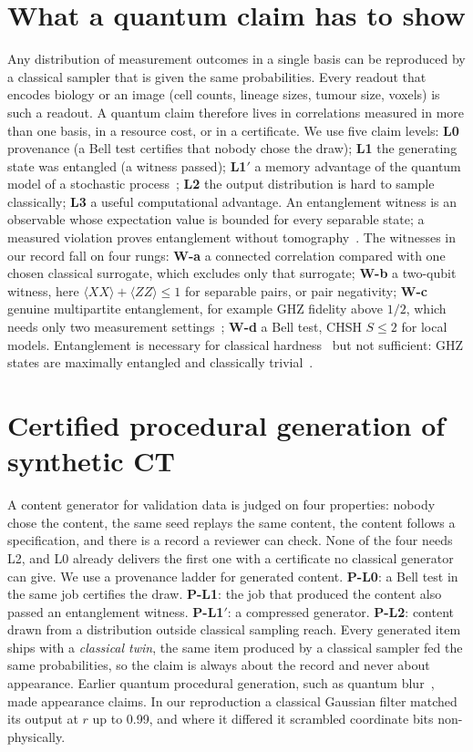 \documentclass[conference]{IEEEtran}
\begin{document}
\section{What a quantum claim has to show}\label{sec:ladder}
Any distribution of measurement outcomes in a single basis can be reproduced by a classical sampler that is given
the same probabilities. Every readout that encodes biology or an image (cell counts, lineage sizes, tumour size,
voxels) is such a readout. A quantum claim therefore lives in correlations measured in more than one basis, in a
resource cost, or in a certificate. We use five claim levels:
\textbf{L0} provenance (a Bell test certifies that nobody chose the draw);
\textbf{L1} the generating state was entangled (a witness passed);
\textbf{L1$'$} a memory advantage of the quantum model of a stochastic process~\cite{gu2012};
\textbf{L2} the output distribution is hard to sample classically;
\textbf{L3} a useful computational advantage.
An entanglement witness is an observable whose expectation value is bounded for every separable state; a measured
violation proves entanglement without tomography~\cite{guhne2009}. The witnesses in our record fall on four rungs:
\textbf{W-a} a connected correlation compared with one chosen classical surrogate, which excludes only that
surrogate; \textbf{W-b} a two-qubit witness, here $\langle XX\rangle+\langle ZZ\rangle\le 1$ for separable pairs, or
pair negativity; \textbf{W-c} genuine multipartite entanglement, for example GHZ fidelity above $1/2$, which needs only
two measurement settings~\cite{toth2005}; \textbf{W-d} a Bell test, CHSH $S\le 2$ for local models. Entanglement is
necessary for classical hardness~\cite{jozsa2003,vidal2003} but not sufficient: GHZ states are maximally entangled
and classically trivial~\cite{gottesman1998}.

\section{Certified procedural generation of synthetic CT}\label{sec:pcg}
A content generator for validation data is judged on four properties: nobody chose the content, the same seed
replays the same content, the content follows a specification, and there is a record a reviewer can check. None of
the four needs L2, and L0 already delivers the first one with a certificate no classical generator can give.
We use a provenance ladder for generated content. \textbf{P-L0}: a Bell test in the same job certifies the draw.
\textbf{P-L1}: the job that produced the content also passed an entanglement witness. \textbf{P-L1$'$}: a compressed
generator. \textbf{P-L2}: content drawn from a distribution outside classical sampling reach. Every generated item
ships with a \emph{classical twin}, the same item produced by a classical sampler fed the same probabilities, so the
claim is always about the record and never about appearance. Earlier quantum procedural generation, such as quantum
blur~\cite{wootton2020}, made appearance claims. In our reproduction a classical Gaussian filter matched its output at
$r$ up to 0.99, and where it differed it scrambled coordinate bits non-physically.
\end{document}
